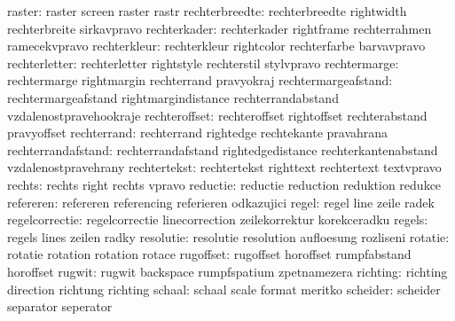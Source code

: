               raster:  raster               screen               raster
                       rastr
      rechterbreedte:  rechterbreedte       rightwidth           rechterbreite
                       sirkavpravo
        rechterkader:  rechterkader         rightframe           rechterrahmen
                       ramecekvpravo
        rechterkleur:  rechterkleur         rightcolor           rechterfarbe
                       barvavpravo
       rechterletter:  rechterletter        rightstyle           rechterstil
                       stylvpravo
        rechtermarge:  rechtermarge         rightmargin          rechterrand
                       pravyokraj
 rechtermargeafstand:  rechtermargeafstand  rightmargindistance  rechterrandabstand
                       vzdalenostpravehookraje
       rechteroffset:  rechteroffset        rightoffset          rechterabstand
                       pravyoffset
         rechterrand:  rechterrand          rightedge            rechtekante
                       pravahrana
  rechterrandafstand:  rechterrandafstand   rightedgedistance    rechterkantenabstand
                       vzdalenostpravehrany
        rechtertekst:  rechtertekst         righttext            rechtertext
                       textvpravo
              rechts:  rechts               right                rechts
                       vpravo
            reductie:  reductie             reduction            reduktion
                       redukce
           refereren:  refereren            referencing          referieren
                       odkazujici
               regel:  regel                line                 zeile
                       radek
      regelcorrectie:  regelcorrectie       linecorrection       zeilekorrektur
                       korekceradku
              regels:  regels               lines                zeilen
                       radky
           resolutie:  resolutie            resolution           aufloesung
                       rozliseni
             rotatie:  rotatie              rotation             rotation
                       rotace
           rugoffset:  rugoffset            horoffset            rumpfabstand
                       horoffset
              rugwit:  rugwit               backspace            rumpfspatium
                       zpetnamezera
            richting:  richting             direction            richtung
                       richting %
              schaal:  schaal               scale                format
                       meritko
            scheider:  scheider             separator            seperator
